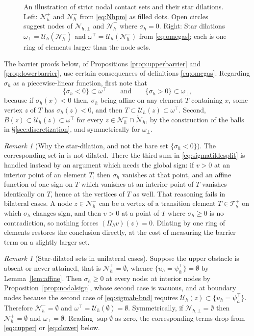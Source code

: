 \documentclass[12pt]{amsart}
\numberwithin{equation}{section}
\theoremstyle{plain}
\theoremstyle{definition}
\theoremstyle{remark}
\newtheorem{remark}[theorem]{Remark}
\newcommand{\psiuph}{\psi^\top_h}
\newcommand{\Th}{\mathcal{T}_h}
\newcommand{\Nh}{\mathcal{N}_h}
\newcommand{\Nhr}{\mathring{\mathcal{N}}_h}
\newcommand{\Pih}{\Pi_h}
\newcommand{\Uh}{\mathcal{U}_h}
\newcommand{\Thplus}{\Th^+}
\newcommand{\Nhbot}{\mathcal{N}_{h,\bot}}
\newcommand{\Nhtop}{\Nh^\top}
\newcommand{\ombot}{\omega_\bot}
\newcommand{\omtop}{\omega^\top}
\begin{document}
\begin{figure}[ht]
\centering

\caption{An illustration of strict nodal contact sets and their star dilations.  Left: $\Nh^+$ and $\Nh^-$ from \eqref{eq:Nhpm} as filled dots.  Open circles suggest nodes of $\Nhbot$ and $\Nhtop$ where $\sigma_h=0$.  Right: Star dilations $\ombot = \Uh(\Nh^+)$ and $\omtop = \Uh(\Nh^-)$ from \eqref{eq:omegas}; each is one ring of elements larger than the node sets.}
\label{fig:stardilate}
\end{figure}

The barrier proofs below, of Propositions \ref{prop:upperbarrier} and \ref{prop:lowerbarrier}, use certain consequences of definitions \eqref{eq:omegas}.  Regarding $\sigma_h$ as a piecewise-linear function, first note that
\begin{equation}
\label{eq:omegacontains}
  \{\sigma_h < 0\} \subset \omtop \qquad \text{and} \qquad \{\sigma_h > 0\} \subset \ombot,
\end{equation}
because if $\sigma_h(x) < 0$ then, $\sigma_h$ being affine on any element $T$ containing $x$, some vertex $z$ of $T$ has $\sigma_h(z) < 0$, and then $T \subset \Uh(z) \subset \omtop$.  Second, $B(z) \subset \Uh(z) \subset \omtop$ for every $z \in \Nh^- \cap \Nhr$, by the construction of the balls in \S \ref{sec:discretization}, and symmetrically for $\ombot$.

\begin{remark}[Why the star-dilation, and not the bare set $\{\sigma_h<0\}$]
\label{rem:whystar}
The corresponding set in \cite[formula (4.6)]{NSV03} is not dilated.  There the third sum in \eqref{eq:sigmatildesplit} is handled instead by an argument which needs the global sign: if $v > 0$ at an interior point of an element $T$, then $\sigma_h$ vanishes at that point, and an affine function of one sign on $T$ which vanishes at an interior point of $T$ vanishes identically on $T$, hence at the vertices of $T$ as well.  That reasoning fails in bilateral cases.  A node $z \in \Nh^-$ can be a vertex of a transition element $T \in \Thplus$ on which $\sigma_h$ changes sign, and then $v > 0$ at a point of $T$ where $\sigma_h \ge 0$ is no contradiction, so nothing forces $(\Pih v)(z) = 0$.  Dilating by one ring of elements restores the conclusion directly, at the cost of measuring the barrier term on a slightly larger set.
\end{remark}

\begin{remark}[Star-dilated sets in unilateral cases]
\label{rem:unilateralstars}
Suppose the upper obstacle is absent or never attained, that is $\Nhtop = \emptyset$, whence $\{u_h = \psiuph\} = \emptyset$ by Lemma~\ref{lem:affine}.  Then $\sigma_h \ge 0$ at every node: at interior nodes by Proposition~\ref{prop:nodalsign}, whose second case is vacuous, and at boundary nodes because the second case of \eqref{eq:sigmah-bnd} requires $\Uh(z) \subset \{u_h = \psiuph\}$.  Therefore $\Nh^- = \emptyset$ and $\omtop = \Uh(\emptyset) = \emptyset$.  Symmetrically, if $\Nhbot = \emptyset$ then $\Nh^+ = \emptyset$ and $\ombot = \emptyset$.  Reading $\sup \emptyset$ as zero, the corresponding terms drop from \eqref{eq:cupper} or \eqref{eq:clower} below.
\end{remark}
\end{document}
